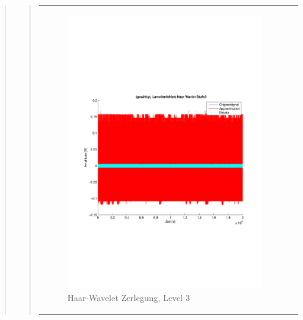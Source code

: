 \begin{quote}
\begin{quote}
       
        \begin{center}
                \begin{tabular}{ll}
    
                \hspace{-8em}
                    \begin{minipage}{0.6\textwidth}
    
                        \begin{figure}[H]
                            \label{fig:}
                            \includegraphics[scale=0.4, trim = 2cm 6cm 1cm
                            7.5cm,
                            clip]{./Bilder/Termin8/lamellenfehler_gesaettigt_Haar_Wavlet_lvl_3}
                            \caption{Haar-Wavelet Zerlegung, Level 3}
                        \end{figure}
    

\end{minipage}
\end{tabular}
\end{center}
\end{quote}
\end{quote}
